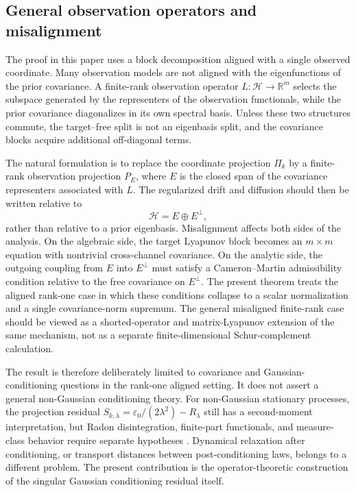\documentclass[11pt]{amsart}
\theoremstyle{plain}
\theoremstyle{definition}
\theoremstyle{remark}
\begin{document}
\subsection{General observation operators and misalignment}
\label{sec:discussion:misalignment}

The proof in this paper uses a block decomposition aligned with a single observed coordinate.  Many observation models are not aligned with the eigenfunctions of the prior covariance.  A finite-rank observation operator $L:\mathcal H\to\mathbb R^m$ selects the subspace generated by the representers of the observation functionals, while the prior covariance diagonalizes in its own spectral basis.  Unless these two structures commute, the target--free split is not an eigenbasis split, and the covariance blocks acquire additional off-diagonal terms.

The natural formulation is to replace the coordinate projection $\Pi_k$ by a finite-rank observation projection $P_E$, where $E$ is the closed span of the covariance representers associated with $L$.  The regularized drift and diffusion should then be written relative to
\[
  \mathcal H=E\oplus E^\perp,
\]
rather than relative to a prior eigenbasis.  Misalignment affects both sides of the analysis.  On the algebraic side, the target Lyapunov block becomes an $m\times m$ equation with nontrivial cross-channel covariance.  On the analytic side, the outgoing coupling from $E$ into $E^\perp$ must satisfy a Cameron--Martin admissibility condition relative to the free covariance on $E^\perp$.  The present theorem treats the aligned rank-one case in which these conditions collapse to a scalar normalization and a single covariance-norm supremum.  The general misaligned finite-rank case should be viewed as a shorted-operator and matrix-Lyapunov extension of the same mechanism, not as a separate finite-dimensional Schur-complement calculation.

The result is therefore deliberately limited to covariance and Gaussian-conditioning questions in the rank-one aligned setting.  It does not assert a general non-Gaussian conditioning theory.  For non-Gaussian stationary processes, the projection residual $S_{k,\lambda}=\varepsilon_0/(2\lambda^2)-R_\lambda$ still has a second-moment interpretation, but Radon disintegration, finite-part functionals, and measure-class behavior require separate hypotheses \cite{bogachev2007measure,kallenberg2021foundations}.  Dynamical relaxation after conditioning, or transport distances between post-conditioning laws, belongs to a different problem.  The present contribution is the operator-theoretic construction of the singular Gaussian conditioning residual itself.
\end{document}

